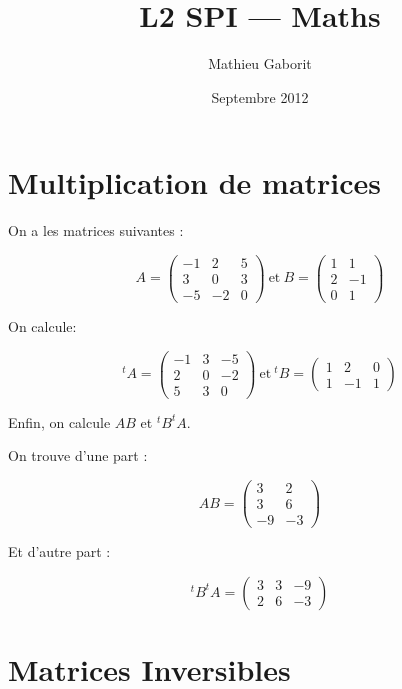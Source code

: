 \documentclass[a4paper, 11pt]{report} %
\title{L2 SPI --- Maths}
\author{Mathieu Gaborit}
\date{Septembre 2012}
\begin{document}
    \maketitle

\section{Multiplication de matrices} %

On a les matrices suivantes :

\[
A = \begin{pmatrix}
-1& 2& 5\\
3& 0& 3\\
-5& -2& 0
\end{pmatrix}
~\textrm{et}~
B = \begin{pmatrix}
1& 1\\
2& -1\\
0& 1
\end{pmatrix}
\]

On calcule:

\[
^tA = \begin{pmatrix}
-1& 3& -5\\
2& 0& -2\\
5& 3& 0
\end{pmatrix}
~\textrm{et}~
^tB = \begin{pmatrix}
1& 2& 0\\
1& -1& 1
\end{pmatrix}
\]

Enfin, on calcule $AB$ et $^tB^tA$.

On trouve d'une part :

\[
AB = \begin{pmatrix}
3& 2\\
3& 6\\
-9& -3
\end{pmatrix}
\]

Et d'autre part :

\[
^tB^tA = \begin{pmatrix}
3& 3& -9\\
2& 6& -3
\end{pmatrix}
\]

\section{Matrices Inversibles} %

\subsection{}
\end{document}
